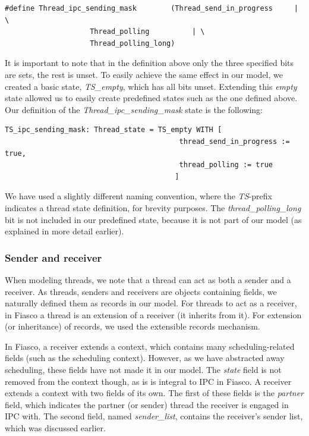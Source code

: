 \lstset{language=C++}
\begin{lstlisting}[caption={C++: \emph{Thread\_ipc\_sending\_mask} state definition.}]
#define Thread_ipc_sending_mask        (Thread_send_in_progress		| \
					Thread_polling			| \
					Thread_polling_long)
\end{lstlisting}

It is important to note that in the definition above only the three specified bits are sets, the rest is unset. To easily achieve the same effect in our model, we created a basic state, \emph{TS\_empty}, which has all bits unset. Extending this \textit{empty} state allowed us to easily create predefined states such as the one defined above. Our definition of the \emph{Thread\_ipc\_sending\_mask} state is the following:

\lstset{language=PVS}
\begin{lstlisting}[caption={PVS: \emph{Thread\_ipc\_sending\_mask} state definition.}]
TS_ipc_sending_mask: Thread_state = TS_empty WITH [
                                         thread_send_in_progress := true,
                                         thread_polling := true
                                        ]
\end{lstlisting}

We have used a slightly different naming convention, where the \emph{TS}-prefix indicates a thread state definition, for brevity purposes. The \emph{thread\_polling\_long} bit is not included in our predefined state, because it is not part of our model (as explained in more detail earlier).

\subsubsection{Sender and receiver}
When modeling threads, we note that a thread can act as both a sender and a receiver. As threads, senders and receivers are objects containing fields, we naturally defined them as records in our model. For threads to act as a receiver, in Fiasco a thread is an extension of a receiver (it inherits from it). For extension (or inheritance) of records, we used the extensible records mechanism.\emptyline

In Fiasco, a receiver extends a context, which contains many scheduling-related fields (such as the scheduling context). However, as we have abstracted away scheduling, these fields have not made it in our model. The \emph{state} field is not removed from the context though, as is is integral to IPC in Fiasco. A receiver extends a context with two fields of its own. The first of these fields is the \emph{partner} field, which indicates the partner (or sender) thread the receiver is engaged in IPC with. The second field, named \emph{sender\_list}, contains the receiver's sender list, which was discussed earlier.

